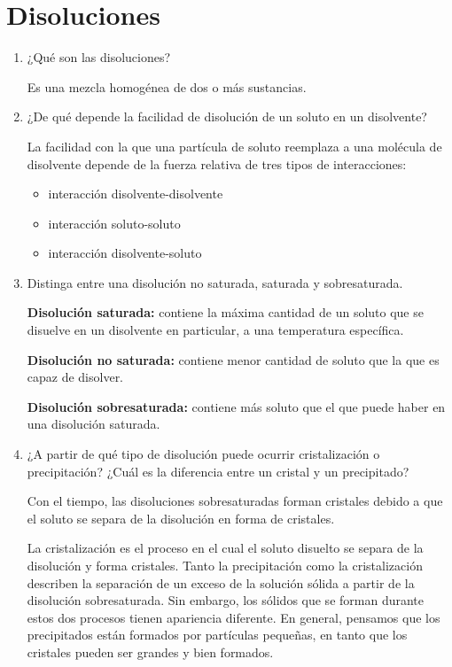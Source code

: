 \documentclass[letterpaper]{article}
\begin{document}
\section*{Disoluciones}
\begin{enumerate}
	\item ¿Qué son las disoluciones? 

		Es una mezcla homogénea de dos o más sustancias.

	\item ¿De qué depende la facilidad de disolución de un soluto en un disolvente?

		La facilidad con la que una partícula de soluto reemplaza a una molécula de disolvente depende de la fuerza relativa de tres tipos de interacciones:
		\begin{itemize}
			\item interacción disolvente-disolvente
			\item interacción soluto-soluto
			\item interacción disolvente-soluto
		\end{itemize}

	\item Distinga entre una disolución no saturada, saturada y sobresaturada.

		\textbf{Disolución saturada:} contiene la máxima cantidad de un soluto que se disuelve en un disolvente en particular, a una temperatura específica.

		\textbf{Disolución no saturada:} contiene menor cantidad de soluto que la que es capaz de disolver.

		\textbf{Disolución sobresaturada:} contiene más soluto que el que puede haber en una disolución saturada.
		
	\item ¿A partir de qué tipo de disolución puede ocurrir cristalización o precipitación? ¿Cuál es la diferencia entre un cristal y un precipitado?

		Con el tiempo, las disoluciones sobresaturadas forman cristales debido a que el soluto se separa de la disolución en forma de cristales.

		La cristalización es el proceso en el cual el soluto disuelto se separa de la disolución y forma cristales. Tanto la precipitación como la cristalización describen la separación de un exceso de la solución sólida a partir de la disolución sobresaturada. Sin embargo, los sólidos que se forman durante estos dos procesos tienen apariencia diferente. En general, pensamos que los precipitados están formados por partículas pequeñas, en tanto que los cristales pueden ser grandes y bien formados.


\end{enumerate}
\end{document}
